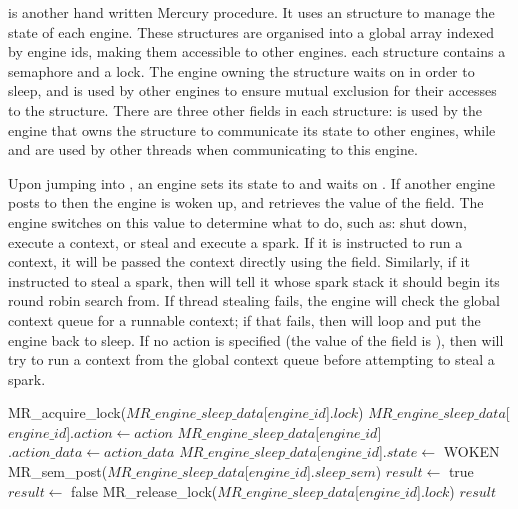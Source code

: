 \sleep is another hand written Mercury procedure.
It uses an
\enginesleepsync structure to manage the state of each engine.
These structures are organised into a global array indexed by engine ids,
making them accessible to other engines.
each structure contains a semaphore and a lock.
The engine owning the structure waits on  in order to
sleep,
and  is used by other engines to ensure mutual exclusion for
their accesses to the \enginesleepsync structure.
There are three other fields in each structure:
 is used by the engine that owns the structure to communicate
its state to other engines,
while  and  are used by other threads when
communicating to this engine.

Upon jumping into \idle,
an engine sets its state to  and waits on .
If another engine posts to  then the engine is woken up,
and retrieves the value of the  field.
The engine switches on this value to determine what to do,
such as:
shut down, 
execute a context, or
steal and execute a spark.
If it is instructed to run a context,
it will be passed the context directly
using the  field.
Similarly, if it instructed to steal a spark,
then  will tell
it whose spark stack it should begin its round robin search from.
If thread stealing fails,
the engine will check the global context queue for
a runnable context;
if that fails,
then \idle will loop and put the engine back to sleep.
If no action is specified
(the value of the  field is ),
then \sleep will try to run a context from the global context queue before
attempting to steal a spark.

\begin{algorithm}[tbp]
\begin{algorithmic}
    \State MR\_acquire\_lock($MR\_engine\_sleep\_data$[$engine\_id$]$.lock$)
        \State $MR\_engine\_sleep\_data$[$engine\_id$]$.action \gets action$
        \State $MR\_engine\_sleep\_data$[$engine\_id$]$.action\_data \gets action\_data$
        \State $MR\_engine\_sleep\_data$[$engine\_id$]$.state \gets$ WOKEN
        \State MR\_sem\_post($MR\_engine\_sleep\_data$[$engine\_id$]$.sleep\_sem$)
        \State $result \gets$ true
    \Else
        \State $result \gets$ false
    \EndIf
    \State MR\_release\_lock($MR\_engine\_sleep\_data$[$engine\_id$]$.lock$)
    \State \Return $result$
\EndProcedure
\end{algorithmic}
\caption{\wakeengine}
\label{alg:wake_engine}
\end{algorithm}


